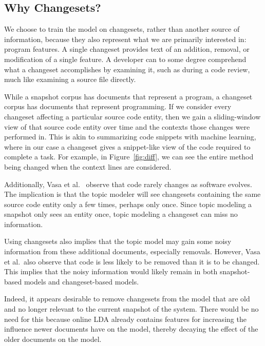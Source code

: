 \subsection{Why Changesets?}

We choose to train the model on changesets, rather than another source of
information, because they also represent what we are primarily interested in:
program features. A single changeset provides text of an addition, removal, or
modification of a single feature. A developer can to some degree comprehend what
a changeset accomplishes by examining it, such as during a code review, much
like examining a source file directly.

While a snapshot corpus has documents that represent a program, a changeset
corpus has documents that represent programming. If we consider every changeset
affecting a particular source code entity, then we gain a sliding-window view of
that source code entity over time and the contexts those changes were performed
in. This is akin to summarizing code snippets with machine
learning\cite{Ying-Robillard_2013}, where in our case a changeset gives a
snippet-like view of the code required to complete a task. For example, in
Figure~\ref{fig:diff}, we can see the entire method being changed when the
context lines are considered.

Additionally, Vasa et al.~\cite{Vasa-etal_2007} observe that code rarely changes
as software evolves. The implication is that the topic modeler will see
changesets containing the same source code entity only a few times, perhaps only
once. Since topic modeling a snapshot only sees an entity once, topic modeling a
changeset can miss no information.

Using changesets also implies that the topic model may gain some noisy
information from these additional documents, especially removals. However, Vasa
et al.\ also observe that code is less likely to be removed than it is to be
changed. This implies that the noisy information would likely remain in both
snapshot-based models and changeset-based models.

Indeed, it appears desirable to remove changesets from the model that are old
and no longer relevant to the current snapshot of the system. There would be no
need for this because online LDA already contains features for increasing the
influence newer documents have on the model, thereby decaying the effect of the
older documents on the model.


